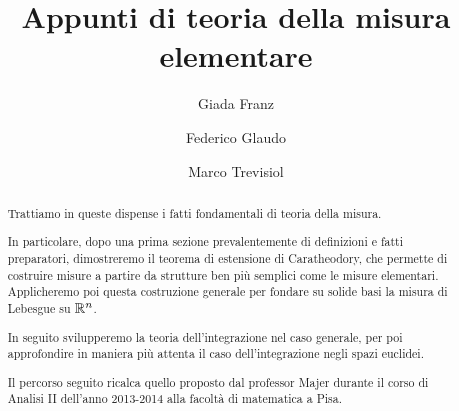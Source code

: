 \documentclass[a4paper,12pt]{article}
\title{Appunti di teoria della misura elementare}
\author{Giada Franz \and Federico Glaudo \and Marco Trevisiol}
\begin{document}
\maketitle


\begin{abstract}
	Trattiamo in queste dispense i fatti fondamentali di teoria della misura.
	
	In particolare, dopo una prima sezione prevalentemente di definizioni e fatti preparatori, dimostreremo il teorema di estensione di Caratheodory, che permette di costruire misure a partire da strutture ben più semplici come le misure elementari. Applicheremo poi questa costruzione generale per fondare su solide basi la misura di Lebesgue su $\mathbb R^n$.
	
	In seguito svilupperemo la teoria dell'integrazione nel caso generale, per poi approfondire in maniera più attenta il caso dell'integrazione negli spazi euclidei.
	
	Il percorso seguito ricalca quello proposto dal professor Majer durante il corso di Analisi II dell'anno 2013-2014 alla facoltà di matematica a Pisa.
\end{abstract}
\clearpage









\end{document}
